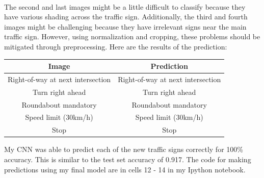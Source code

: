 \documentclass[12pt]{article}
\begin{document}
\begin{figure}[!h]
 \\
\end{figure}

The second and last images might be a little difficult to classify because they have various shading across the traffic sign. Additionally, the third and fourth images might be challenging because they have irrelevant signs near the main traffic sign. However, using normalization and cropping, these problems should be mitigated through preprocessing. Here are the results of the prediction:
\begin{center}
\begin{tabular}{|c|c|}
\hline
\textbf{Image} & \textbf{Prediction} \\
\hline
Right-of-way at next intersection & Right-of-way at next intersection \\
\hline
Turn right ahead & Turn right ahead \\
\hline
Roundabout mandatory & Roundabout mandatory \\
\hline
Speed limit (30km/h) & Speed limit (30km/h) \\
\hline
Stop & Stop \\
\hline
\end{tabular}
\end{center}
My CNN was able to predict each of the new traffic signs correctly for 100\% accuracy. This is similar to the test set accuracy of 0.917. The code for making predictions using my final model are in cells 12 - 14 in my Ipython notebook. 
\end{document}
